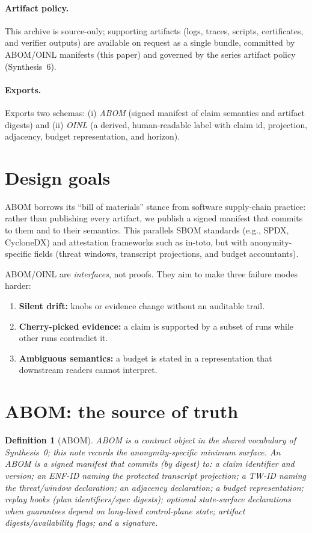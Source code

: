 \documentclass[11pt]{article}
\newtheorem{definition}{Definition}
\begin{document}
\paragraph{Artifact policy.} This archive is source-only; supporting artifacts (logs, traces, scripts, certificates, and verifier outputs) are available on request as a single bundle, committed by ABOM/OINL manifests (this paper) and governed by the series artifact policy (Synthesis~6).\cite{series:artifactpolicy}

\paragraph{Exports.}
Exports two schemas: (i) \emph{ABOM} (signed manifest of claim semantics and artifact digests) and
(ii) \emph{OINL} (a derived, human-readable label with claim id, projection, adjacency, budget representation, and horizon).


\section{Design goals}
ABOM borrows its ``bill of materials'' stance from software supply-chain practice: rather than publishing every artifact, we publish a signed manifest that commits to them and to their semantics.
This parallels SBOM standards (e.g., SPDX, CycloneDX) and attestation frameworks such as in-toto, but with anonymity-specific fields (threat windows, transcript projections, and budget accountants).\cite{ntiaSBOM2019,spdx301,cyclonedx,intoto2019}

ABOM/OINL are \emph{interfaces}, not proofs.
They aim to make three failure modes harder:
\begin{enumerate}[leftmargin=*]
\item \textbf{Silent drift:} knobs or evidence change without an auditable trail.
\item \textbf{Cherry-picked evidence:} a claim is supported by a subset of runs while other runs contradict it.
\item \textbf{Ambiguous semantics:} a budget is stated in a representation that downstream readers cannot interpret.
\end{enumerate}

\section{ABOM: the source of truth}
\begin{definition}[ABOM]\label{def:abom}
ABOM is a contract object in the shared vocabulary of Synthesis~0; this note records the anonymity-specific minimum surface.\cite{series:contractobjects}
An ABOM is a signed manifest that commits (by digest) to: a claim identifier and version; an ENF-ID naming the protected transcript projection; a TW-ID naming the threat/window declaration; an adjacency declaration; a budget representation; replay hooks (plan identifiers/spec digests); optional state-surface declarations when guarantees depend on long-lived control-plane state; artifact digests/availability flags; and a signature.
\end{definition}
\end{document}
